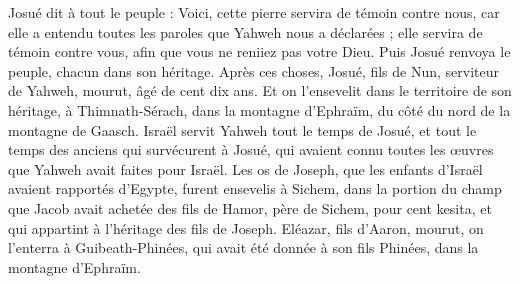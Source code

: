 \begin{multicols}{2}
Josué dit à tout le peuple : Voici, cette pierre servira de témoin contre nous, car elle a entendu toutes les paroles que Yahweh nous a déclarées ; elle servira de témoin contre vous, afin que vous ne reniiez pas votre Dieu.
Puis Josué renvoya le peuple, chacun dans son héritage.
Après ces choses, Josué, fils de Nun, serviteur de Yahweh, mourut, âgé de cent dix ans.
Et on l’ensevelit dans le territoire de son héritage, à Thimnath-Sérach, dans la montagne d’Ephraïm, du côté du nord de la montagne de Gaasch.
Israël servit Yahweh tout le temps de Josué, et tout le temps des anciens qui survécurent à Josué, qui avaient connu toutes les œuvres que Yahweh avait faites pour Israël.
Les os de Joseph, que les enfants d’Israël avaient rapportés d’Egypte, furent ensevelis à Sichem, dans la portion du champ que Jacob avait achetée des fils de Hamor, père de Sichem, pour cent kesita, et qui appartint à l’héritage des fils de Joseph.
Eléazar, fils d’Aaron, mourut, on l’enterra à Guibeath-Phinées, qui avait été donnée à son fils Phinées, dans la montagne d’Ephraïm.
\PPE{}
\end{multicols}
